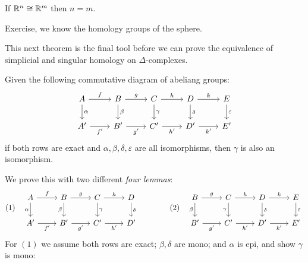 \documentclass[a4paper]{article}
\begin{document}
\begin{theorem}
    If $\mathbb{R}^n\cong\mathbb{R}^m$ then $n=m$.
    \begin{prf}
        Exercise, we know the homology groups of the sphere.
    \end{prf}
\end{theorem}
This next theorem is the final tool before we can prove the equivalence of simplicial and singular homology on $\Delta$-complexes.
\begin{theorem}
    Given the following commutative diagram of abeliang groups:\[\begin{tikzcd}
        A \arrow[r, "f"] \arrow[d, "\alpha"] &
        B \arrow[r, "g"] \arrow[d, "\beta"] &
        C \arrow[r, "h"] \arrow[d, "\gamma"] &
        D \arrow[r, "k"] \arrow[d, "\delta"] &
        E \arrow[d, "\varepsilon"] \\
        A' \arrow[r, "f'", swap] &
        B' \arrow[r, "g'", swap] &
        C' \arrow[r, "h'", swap] &
        D' \arrow[r, "k'", swap] &
        E'
    \end{tikzcd}\]
    if both rows are exact and $\alpha,\beta,\delta,\varepsilon$ are all isomorphisms, then $\gamma$ is also an isomorphism.
    \begin{prf}
        We prove this with two different \textit{four lemmas}:\[
        (1)\quad
        \begin{tikzcd}
            A \arrow[r, "f"] \arrow[d, "\alpha", swap] &
            B \arrow[r, "g"] \arrow[d, "\beta", swap] &
            C \arrow[r, "h"] \arrow[d, "\gamma"] &
            D \arrow[d, "\delta"] \\
            A' \arrow[r, "f'", swap] &
            B' \arrow[r, "g'", swap] &
            C' \arrow[r, "h'", swap] &
            D'
        \end{tikzcd}
        \qquad \qquad
        (2)\quad
        \begin{tikzcd}
            B \arrow[r, "g"] \arrow[d, "\beta", swap] &
            C \arrow[r, "h"] \arrow[d, "\gamma", swap] &
            D \arrow[r, "k"] \arrow[d, "\delta"] &
            E \arrow[d, "\varepsilon"] \\
            B' \arrow[r, "g'", swap] &
            C' \arrow[r, "h'", swap] &
            D' \arrow[r, "k'", swap] &
            E'
        \end{tikzcd}
        \]
    For $(1)$ we assume both rows are exact; $\beta,\delta$ are mono; and $\alpha$ is epi, and show $\gamma$ is mono:
    \begin{itemize}

\end{itemize}
\end{prf}
\end{theorem}
\end{document}

